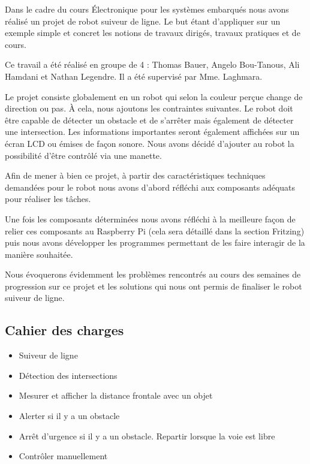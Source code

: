 Dans le cadre du cours Électronique pour les systèmes embarqués nous avons réalisé un projet de robot suiveur de ligne. Le but étant d'appliquer sur un exemple simple et concret les notions de travaux dirigés, travaux pratiques et de cours.

Ce travail a été réalisé en groupe de 4 : Thomas Bauer, Angelo Bou-Tanous, Ali Hamdani et Nathan Legendre. Il a été supervisé par Mme. Laghmara.

Le projet consiste globalement en un robot qui selon la couleur perçue change de direction ou pas. À cela, nous ajoutons les contraintes suivantes. Le robot doit être capable de détecter un obstacle et de s'arrêter mais également de détecter une intersection. Les informations importantes seront également affichées sur un écran LCD ou émises de façon sonore. Nous avons décidé d'ajouter au robot la possibilité d'être contrôlé via une manette.

Afin de mener à bien ce projet, à partir des caractéristiques techniques demandées pour le robot nous avons d'abord réfléchi aux composants adéquats pour réaliser les tâches.

Une fois les composants déterminées nous avons réfléchi à la meilleure façon de relier ces composants au Raspberry Pi (cela sera détaillé dans la section Fritzing) puis nous avons développer les programmes permettant de les faire interagir de la manière souhaitée.

Nous évoquerons évidemment les problèmes rencontrés au cours des semaines de progression sur ce projet et les solutions qui nous ont permis de finaliser le robot suiveur de ligne.

\subsection*{Cahier des charges}
\begin{itemize}
    \item Suiveur de ligne
    \item Détection des intersections
    \item Mesurer et afficher la distance frontale avec un objet
    \item Alerter si il y a un obstacle
    \item Arrêt d'urgence si il y a un obstacle. Repartir lorsque la voie est libre
    \item Contrôler manuellement
\end{itemize}

\newpage
